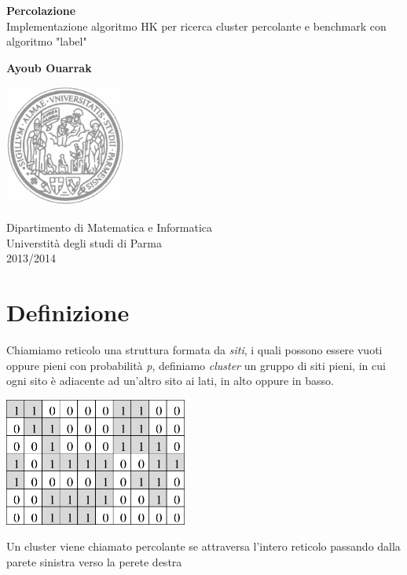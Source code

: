 \documentclass[10pt,a4paper]{article}
\begin{document}
\begin{titlepage}
\begin{center}
\vspace*{1cm}
\Huge
\textbf{Percolazione}
\vspace{0.5cm}
\LARGE
\\
Implementazione algoritmo HK per ricerca cluster percolante e benchmark con algoritmo "label" 
        
\vspace{1.5cm}
\textbf{Ayoub Ouarrak}
\vfill
        
\vspace{0.8cm}
\begin{center}
\includegraphics[width=4.0cm]{Unipr.png} 
\end{center}
\Large
Dipartimento di Matematica e Informatica\\
Universtità degli studi di Parma\\
2013/2014        
\end{center}
\end{titlepage}
\newpage
\tableofcontents

\newpage
\section{Definizione}
Chiamiamo reticolo una struttura formata da \emph{siti}, i quali possono essere vuoti oppure pieni con probabilità \emph{p}, definiamo \emph{cluster} un gruppo di siti pieni, in cui ogni sito è adiacente ad un'altro sito ai lati, in alto oppure in basso.\\
\begin{center}
\includegraphics[width=6.0cm]{cluster.png}
\end{center}
Un cluster viene chiamato percolante se attraversa l'intero reticolo passando dalla parete sinistra verso la perete destra
\end{document}
